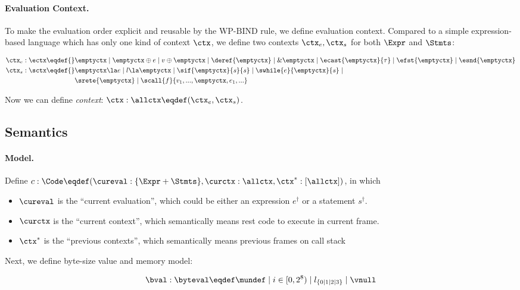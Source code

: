 \paragraph{Evaluation Context.}

To make the evaluation order explicit and reusable by the $\text{WP-BIND}$ rule, we define evaluation context.
Compared to a simple expression-based language which has only one kind of context $\ctx$, we define two contexts
$\ctx_e, \ctx_s$ for both $\Expr$ and $\Stmts$:

\begin{align*}
    \ctx_e : \ectx \eqdef{}&
        \emptyctx \mid \emptyctx \oplus e \mid v \oplus \emptyctx \mid
        \deref{\emptyctx} \mid \& \emptyctx \mid \ecast{\emptyctx}{\tau} \mid
        \efst{\emptyctx} \mid \esnd{\emptyctx}
\\
    \ctx_s : \sctx \eqdef{}&
        \emptyctx \la e \mid l \la \emptyctx \mid \sif{\emptyctx}{s}{s} \mid \swhile{e}{\emptyctx}{s} \mid \\&
         \srete{\emptyctx} \mid \scall{f}{v_1, ..., \emptyctx, e_1, ...}
\end{align*}

Now we can define \emph{context}: $\ctx : \allctx \eqdef (\ctx_e, \ctx_s)$.

\subsection{Semantics}
\paragraph{Model.}

Define $c: \Code \eqdef (\cureval: \{ \Expr + \Stmts\}, \curctx: \allctx, \ctx^{*}: [\allctx])$, in which

\begin{itemize}
\item $\cureval$ is the ``current evaluation'', which could be either an expression $e^\dag$ or a statement $s^\dag$.
\item $\curctx$ is the ``current context'', which semantically means rest code to execute in current frame.
\item $\ctx^{*}$ is the ``previous contexts'', which semantically means previous frames on call stack
\end{itemize}

Next, we define byte-size value and memory model:

\[\bval : \byteval \eqdef \mundef \mid i \in [0, 2^8) \mid l_{\{0 \mid 1 \mid 2 \mid 3\}} \mid \vnull\]

